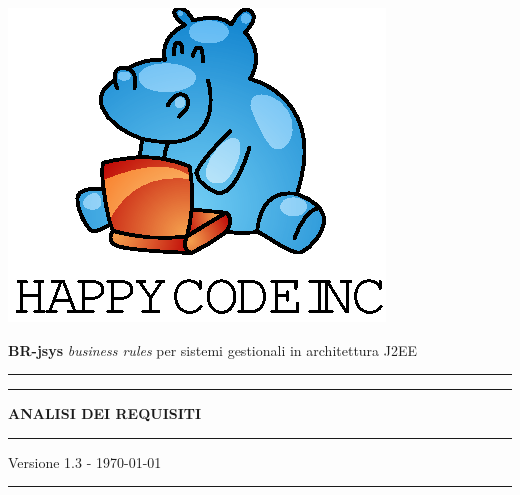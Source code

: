 \documentclass[11pt,titlepage,a4paper]{report}
\begin{document}
\begin{titlepage}
\begin{center}
\vspace*{0.5in}
\includegraphics{logo.eps}
\vspace*{0.2in}

{\Large \textbf{BR-jsys}}
{\Large \emph{business rules} per sistemi gestionali in architettura J2EE } 
\vspace{1.3in}
\par\rule{10cm}{.4pt} \par
\par\rule{12cm}{1pt} \par
\vspace*{0.5in}
\LARGE \textbf {ANALISI DEI REQUISITI}
\vspace*{0.5in}
\par\rule{12cm}{1pt} \par
{\large Versione 1.3 - \today}
\par\rule{10cm}{.4pt} \par

\end{center}
\end{titlepage}
\vspace*{0.5in}
\end{document}
